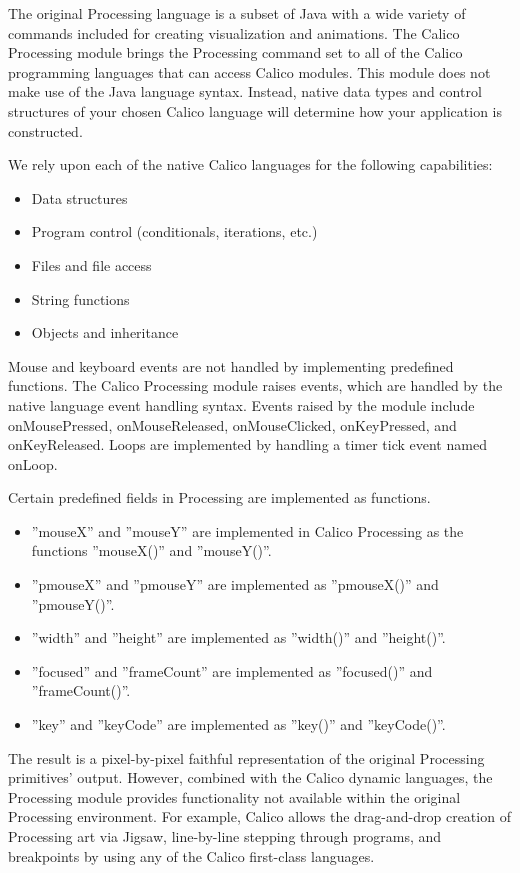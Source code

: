 \documentclass[preprint]{sigplanconf}
\begin{document}
The original Processing language is a subset of Java with a wide variety of
commands included for creating visualization and animations. The
Calico Processing module brings the Processing command set to all of the Calico
programming languages that can access Calico modules. This module does not make use of the Java
language syntax. Instead, native data types and control structures of
your chosen Calico language will determine how your application is
constructed.

We rely upon each of the native Calico languages for the following capabilities:

\begin{itemize}
\item Data structures
\item Program control (conditionals, iterations, etc.)
\item Files and file access
\item String functions
\item Objects and inheritance
\end{itemize}

Mouse and keyboard events are not handled by implementing predefined
functions. The Calico Processing module raises events, which are
handled by the native language event handling syntax. Events raised by
the module include onMousePressed, onMouseReleased, onMouseClicked,
onKeyPressed, and onKeyReleased. Loops are implemented by handling a
timer tick event named onLoop.

Certain predefined fields in Processing are implemented as functions.

\begin{itemize}
\item ''mouseX'' and ''mouseY'' are implemented in Calico Processing as the functions ''mouseX()'' and ''mouseY()''.
\item ''pmouseX'' and ''pmouseY'' are implemented as ''pmouseX()'' and ''pmouseY()''.
\item ''width'' and ''height'' are implemented as ''width()'' and ''height()''.
\item ''focused'' and ''frameCount'' are implemented as ''focused()'' and ''frameCount()''.
\item ''key'' and ''keyCode'' are implemented as ''key()'' and ''keyCode()''.
\end{itemize}

The result is a pixel-by-pixel faithful representation of the original
Processing primitives' output. However, combined with the Calico
dynamic languages, the Processing module provides functionality not
available within the original Processing environment. For example,
Calico allows the drag-and-drop creation of Processing art via Jigsaw,
line-by-line stepping through programs, and breakpoints by using any
of the Calico first-class languages.
\end{document}
